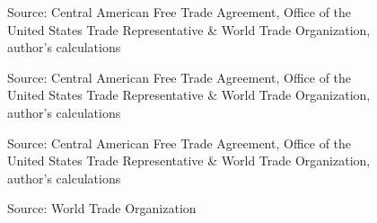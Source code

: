 \documentclass[12pt]{article}
\begin{document}
\begin{figure}[H]
% 
\caption{\label{fig:Graph1}}
Source: Central American Free Trade Agreement, Office of the United States Trade Representative \&
World Trade Organization, author's calculations
\end{figure}

\begin{figure}[H]
%
\caption{\label{fig:Graph2}}
Source: Central American Free Trade Agreement, Office of the United States Trade Representative \&
World Trade Organization, author's calculations
\end{figure}

\begin{figure}[H]
%
\caption{\label{fig:Graph3}}
Source: Central American Free Trade Agreement, Office of the United States Trade Representative \&
World Trade Organization, author's calculations
\end{figure}

\begin{figure}[H]
%
\caption{\label{fig:Graph4}}
Source: World Trade Organization
\end{figure}
\end{document}
